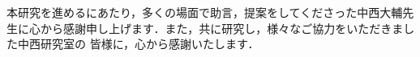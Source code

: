 \newpage
{}
本研究を進めるにあたり，多くの場面で助言，提案をしてくださった中西大輔先生に心から感謝申し上げます．また，共に研究し，様々なご協力をいただきました中西研究室の
皆様に，心から感謝いたします．